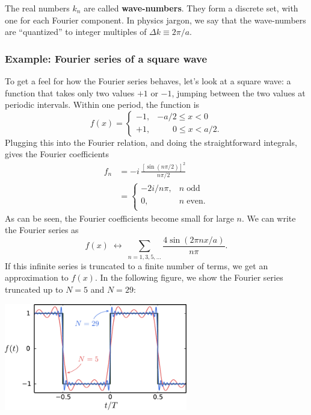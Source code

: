 \documentclass[10pt,a4paper]{article}
\begin{document}
The real numbers $k_n$ are called \textbf{wave-numbers}. They form a
discrete set, with one for each Fourier component. In physics jargon, we
say that the wave-numbers are ``quantized'' to integer multiples of
$\Delta k \equiv 2\pi/a.$

\subsubsection{Example: Fourier series of a square wave}
\label{example-fourier-series-of-a-square-wave}

To get a feel for how the Fourier series behaves, let's look at a square
wave: a function that takes only two values $+1$ or $-1$, jumping
between the two values at periodic intervals. Within one period, the
function is
\begin{equation}
f(x) = \left\{\begin{array}{ll}-1, & -a/2 \le x < 0 \\ +1, & \quad\;\;\; 0 \le x < a/2.\end{array}\right.
\end{equation}
Plugging this into the Fourier relation, and doing the straightforward
integrals, gives the Fourier coefficients
\begin{equation}
\begin{aligned} f_n &= -i \, \frac{\left[\sin\left(n \pi/2\right)\right]^2}{n\pi/2 } \\ &= \left\{\begin{array}{cl} -2i/n\pi ,& n \; \mathrm{odd} \\ 0,& n \; \mathrm{even}. \\\end{array}\right.\end{aligned}
\end{equation}
As can be seen, the Fourier coefficients become small for large $n$.
We can write the Fourier series as
\begin{equation}
f(x) \; \leftrightarrow \; \sum_{n=1,3,5,\dots} \frac{4\sin(2\pi n x / a)}{n \pi}.
\end{equation}
If this infinite series is truncated to a finite number of terms, we get
an approximation to $f(x)$. In the
following figure, we show the Fourier series truncated up to $N
= 5$ and $N= 29$:

\begin{center}
  \includegraphics[width=0.6\textwidth]{square_fourier}
\end{center}
\end{document}
